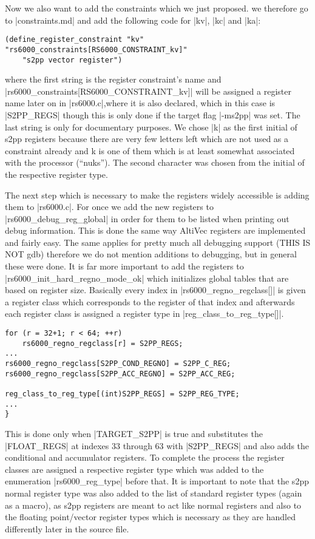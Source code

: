 Now we also want to add the constraints which we just proposed.
we therefore go to |constraints.md| and add the following code for |kv|, |kc| and |ka|:
\begin{lstlisting}
(define_register_constraint "kv" "rs6000_constraints[RS6000_CONSTRAINT_kv]"
    "s2pp vector register")
\end{lstlisting}
where the first string is the register constraint's name and |rs6000_constraints[RS6000_CONSTRAINT_kv]| will be assigned a register name later on in |rs6000.c|,where it is also declared, which in this case is |S2PP_REGS| though this is only done if the target flag |-ms2pp| was set.
The last string is only for documentary purposes.\cite{GCCint:constraints}
We chose |k| as the first initial of s2pp registers because there are very few letters left which are not used as a constraint already and k is one of them which is at least somewhat associated with the processor (``nuks'').
The second character was chosen from the initial of the respective register type.

The next step which is necessary to make the registers widely accessible is adding them to |rs6000.c|.
For once we add the new registers to |rs6000_debug_reg_global| in order for them to be listed when printing out debug information.
This is done the same way AltiVec registers are implemented and fairly easy.
The same applies for pretty much all debugging support (THIS IS NOT gdb) therefore we do not mention additions to debugging, but in general these were done.
It is far more important to add the registers to |rs6000_init_hard_regno_mode_ok| which initializes global tables that are based on register size.
Basically every index in |rs6000_regno_regclass[]| is given a register class which corresponds to the register of that index and afterwards each register class is assigned a register type in |reg_class_to_reg_type[]|.
\begin{lstlisting}
for (r = 32+1; r < 64; ++r)
    rs6000_regno_regclass[r] = S2PP_REGS;
...
rs6000_regno_regclass[S2PP_COND_REGNO] = S2PP_C_REG;
rs6000_regno_regclass[S2PP_ACC_REGNO] = S2PP_ACC_REG;

reg_class_to_reg_type[(int)S2PP_REGS] = S2PP_REG_TYPE;
...
}
\end{lstlisting}

This is done only when |TARGET_S2PP| is true and substitutes the |FLOAT_REGS| at indexes 33 through 63 with |S2PP_REGS| and also adds the conditional and accumulator registers.
To complete the process the register classes are assigned a respective register type which was added to the enumeration |rs6000_reg_type| before that.
It is important to note that the s2pp normal register type was also added to the list of standard register types (again as a macro), as s2pp registers are meant to act like normal registers and also to the floating point/vector register types which is necessary as they are handled differently later in the source file.

